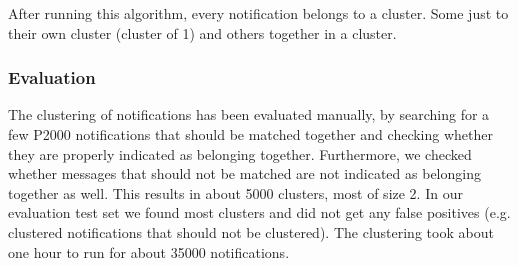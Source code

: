 After running this algorithm, every notification belongs to a cluster. Some just to their own cluster (cluster of 1) and others together in a cluster.
\subsubsection*{Evaluation}
The clustering of notifications has been evaluated manually, by searching for a few P2000 notifications that should be matched together and checking whether they are properly indicated as belonging together. Furthermore, we checked whether messages that should not be matched are not indicated as belonging together as well. This results in about 5000 clusters, most of size 2. In our evaluation test set we found most clusters and did not get any false positives (e.g. clustered notifications that should not be clustered). The clustering took about one hour to run for about 35000 notifications.
